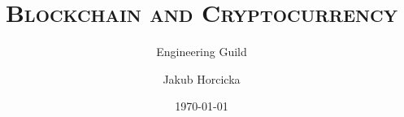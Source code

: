 \documentclass[xcolor=dvipsnames]{beamer}
\author{Jakub Horcicka}
\title{\textsc{Blockchain and Cryptocurrency}}
\subtitle{Engineering Guild}
\date{\today}
\begin{document}
 
  \begin{frame}
    \titlepage
  \end{frame}

  
  
  
  
\end{document}
